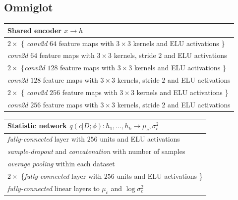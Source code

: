 \documentclass{article} %
\begin{document}
\subsection{Omniglot}
\label{appendixb:omniglot}
\begin{table}[H]

    \begin{tabular}{  l}
    \bf{Shared encoder} $x \to h$ \\ \hline
    $2 \times$ \{ \emph{conv2d} $64$ feature maps with $3 \times 3$ kernels and ELU activations \} \\
    \emph{conv2d} $64$ feature maps with $3 \times 3$ kernels, stride $2$ and ELU activations \\
    
    $2 \times$ \{\emph{conv2d} $128$ feature maps with $3 \times 3$ kernels and ELU activations \} \\
    \emph{conv2d} $128$ feature maps with $3 \times 3$ kernels, stride $2$ and ELU activations  \\
    
    $2 \times$ \{ \emph{conv2d} $256$ feature maps with $3 \times 3$ kernels and ELU activations \} \\
    \emph{conv2d} $256$ feature maps with $3 \times 3$ kernels, stride $2$ and ELU activations
    \label{table:omniglot_common_encoder}
    \end{tabular}
\end{table}
\begin{table}[H]

    \begin{tabular}{  l}
    \bf{Statistic network} $q(c | D;  \phi): h_1, \dots, h_k \to \mu_c, \sigma^2_c$ \\ \hline
    \emph{fully-connected} layer with $256$ units and ELU activations \\
    \emph{sample-dropout} and \emph{concatenation} with number of samples \\
    \emph{average pooling} within each dataset\\
    $2 \times$ \{\emph{fully-connected} layer with $256$ units and ELU activations \} \\
    \emph{fully-connected} linear layers to $\mu_c$ and $\log \sigma^2_c$
    \label{table:omniglot_statistic_network}
    \end{tabular}
\end{table}
\end{document}
